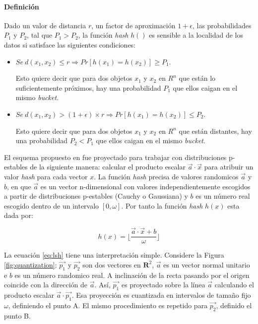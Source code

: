 \paragraph{Definición} Dado un valor de distancia $r$, un factor de aproximación $1+\epsilon$, las probabilidades $P_1$ y $P_2$, tal que $P_1 > P_2$, la función \textit{hash}  $h()$ es sensible a la localidad de los datos si satisface las siguientes condiciones:

\begin{itemize}
\item $Se \ d(x_1, x_2) \leq r \Rightarrow Pr[h(x_1) = h(x_2)]  \geq P_1$.

Esto quiere decir que para dos objetos  $x_1$ y $x_2$ en $R^n$  que están lo suficientemente próximos,  hay una probabilidad   $P_1$ que ellos caigan en el mismo \textit{bucket}.

\item $Se\ d(x_1, x_2) > (1+\epsilon) \times r  \Rightarrow Pr[h(x_1) = h(x_2)] \leq P_2$.

Esto quiere decir que para dos objetos $x_1$ y $x_2$ en $R^n$ que están distantes, hay una probabilidad $P_2 < P_1$ que ellos caigan en el mismo  \textit{bucket}.

\end{itemize}

El esquema propuesto en \cite{Datar2004} fue proyectado para trabajar con distribuciones p-estables de la siguiente manera: calcular el producto escalar $\vec{a} \cdot \vec{x}$ para atribuir un valor \textit{hash} para cada vector $x$. La función  \textit{hash} precisa de valores randomicos $\vec{a}$ y $b$, en que $\vec{a}$ es un vector n-dimensional con valores independientemente escogidos a partir de distribuciones p-estables (Cauchy o Gaussiana) y $b$ es un número real escogido dentro de un intervalo $[0,\omega]$. Por tanto la función \textit{hash} $h(x)$ esta dada por:


\begin{equation}\label{eq:lsh}
    h(x) = \lfloor\frac{\vec{a} \cdot \vec{x} + b}{ \omega }\rfloor
\end{equation}

La ecuación \ref{eq:lsh} tiene una interpretación simple. Considere la Figura \ref{fig:quantization}: $\vec{p_1}$ y $\vec{p_2}$ son dos vectores en $\mathbf{R}^2$, $\vec{a}$ es un vector normal unitario e $b$ es un número randomico real. A inclinación de la recta pasando por el origen coincide con la dirección de $\vec{a}$. Así, $\vec{p_1}$  es proyectado sobre la línea $\vec{a}$  calculando el producto escalar  $\vec{a} \cdot \vec{p_1}$. Esa proyección es cuantizada en intervalos de tamaño fijo  $\omega$, definiendo el punto A. El mismo procedimiento es repetido para $\vec{p_2}$, definido el punto B.

